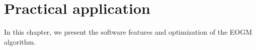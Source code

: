 \chapter{Practical application}    

In this chapter, we present the software features and optimization of the EOGM algorithm. 






